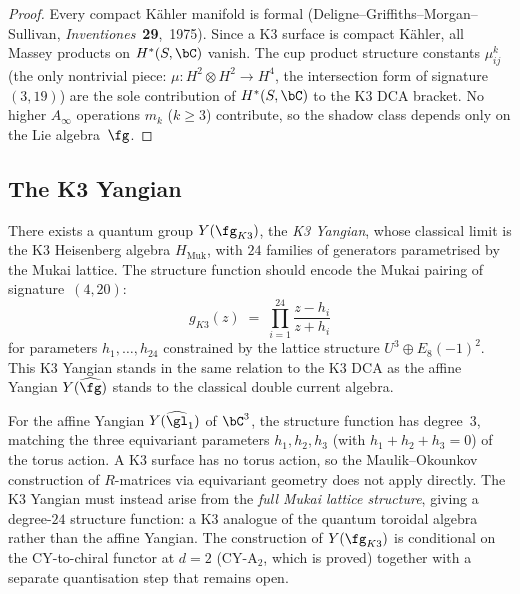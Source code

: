 \begin{proof}
Every compact K\"ahler manifold is formal
(Deligne--Griffiths--Morgan--Sullivan,
\emph{Inventiones}~\textbf{29},~1975).
Since a K3 surface is compact K\"ahler, all Massey products on
$H^*(S, \bC)$ vanish.
The cup product structure constants $\mu^k_{ij}$ (the only
nontrivial piece: $\mu \colon H^2 \otimes H^2 \to H^4$,
the intersection form of signature~$(3, 19)$) are the sole
contribution of $H^*(S, \bC)$ to the K3 DCA bracket.
No higher $A_\infty$ operations $m_k$ ($k \geq 3$) contribute,
so the shadow class depends only on the Lie algebra~$\fg$.
\end{proof}

\subsection{The K3 Yangian}
\label{subsec:k3-yangian}

\begin{conjecture}
\label{conj:k3-yangian}
\ClaimStatusConjectured
There exists a quantum group $Y(\fg_{K3})$, the \emph{K3 Yangian}, whose
classical limit is the K3 Heisenberg algebra $H_{\mathrm{Muk}}$,
with $24$ families of generators parametrised by the Mukai lattice.
The structure function should encode the Mukai pairing of
signature~$(4, 20)$:
\[
  g_{K3}(z) \;=\;
  \prod_{i=1}^{24} \frac{z - h_i}{z + h_i}
\]
for parameters $h_1, \ldots, h_{24}$ constrained by the lattice structure
$U^3 \oplus E_8(-1)^2$.
This K3 Yangian stands in the same relation to the K3 DCA as the affine
Yangian $Y(\widehat{\fg})$ stands to the classical double current algebra.
\end{conjecture}

\begin{remark}
\label{rem:k3-yangian-obstruction}
For the affine Yangian $Y(\widehat{\gl}_1)$ of $\bC^3$, the structure
function has degree~$3$, matching the three equivariant parameters
$h_1, h_2, h_3$ (with $h_1 + h_2 + h_3 = 0$) of the torus action.
A K3 surface has no torus action, so the Maulik--Okounkov construction
of $R$-matrices via equivariant geometry does not apply directly.
The K3 Yangian must instead arise from the \emph{full Mukai lattice
structure}, giving a degree-$24$ structure function: a K3 analogue of
the quantum toroidal algebra rather than the affine Yangian.
The construction of $Y(\fg_{K3})$ is conditional on the CY-to-chiral
functor at $d = 2$ (CY-A$_2$, which is proved) together with a
separate quantisation step that remains open.
\end{remark}

